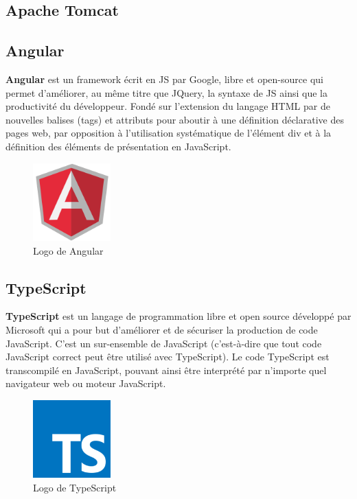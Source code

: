 \documentclass[12pt]{report}
\begin{document}
	\subsection{Apache Tomcat}
	  
	\subsection{Angular}
	  \textbf{Angular} est un framework écrit en \gls{JS} par Google, libre et open-source qui permet d'améliorer, au même titre que JQuery, la syntaxe de \gls{JS} ainsi que la productivité du développeur. Fondé sur l’extension du langage HTML par de nouvelles balises (tags) et attributs pour aboutir à une définition déclarative des pages web, par opposition à l’utilisation systématique de l’élément div​ et à la définition des éléments de présentation en JavaScript.
	  
	  \begin{figure}[H]
	    \begin{center}
	      \includegraphics[scale=0.6, width=3cm]{images/logoAngular.png}
	      \caption{Logo de Angular}
	    \end{center}
	  \end{figure}
	  
	  \subsection{TypeScript}
	    \textbf{TypeScript} est un langage de programmation libre et open source développé par Microsoft qui a pour but d'améliorer et de sécuriser la production de code JavaScript. C'est un sur-ensemble de JavaScript (c'est-à-dire que tout code JavaScript correct peut être utilisé avec TypeScript). Le code TypeScript est transcompilé en JavaScript, pouvant ainsi être interprété par n'importe quel navigateur web ou moteur JavaScript.
	    
	     \begin{figure}[H]
	      \begin{center}
		\includegraphics[scale=0.6, width=3cm]{images/logoTypeScript.png}
		\caption{Logo de TypeScript}
	      \end{center}
	    \end{figure}
	    
\end{document}
